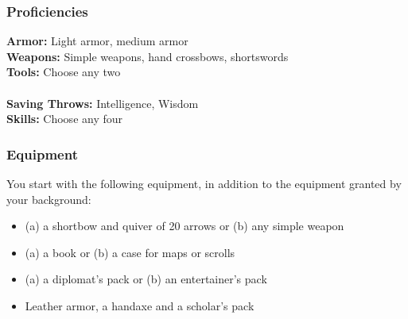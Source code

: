 \documentclass[letterpaper,openany,twoside,twocolumn]{book}
\begin{document}
	
	\subsubsection*{Proficiencies}
	\textbf{Armor:} Light armor, medium armor\\
	\textbf{Weapons:} Simple weapons, hand crossbows, shortswords\\
	\textbf{Tools:} Choose any two\\\\
	\textbf{Saving Throws:} Intelligence, Wisdom\\
	\textbf{Skills:} Choose any four
	
	\subsubsection*{Equipment}
	You start with the following equipment, in addition to the equipment granted by your background:
	\begin{itemize}
		\item (a) a shortbow and quiver of 20 arrows or (b) any simple weapon
		\item (a) a book or (b) a case for maps or scrolls
		\item (a) a diplomat’s pack or (b) an entertainer's pack
		\item Leather armor, a handaxe and a scholar's pack
	\end{itemize}
	
\end{document}
